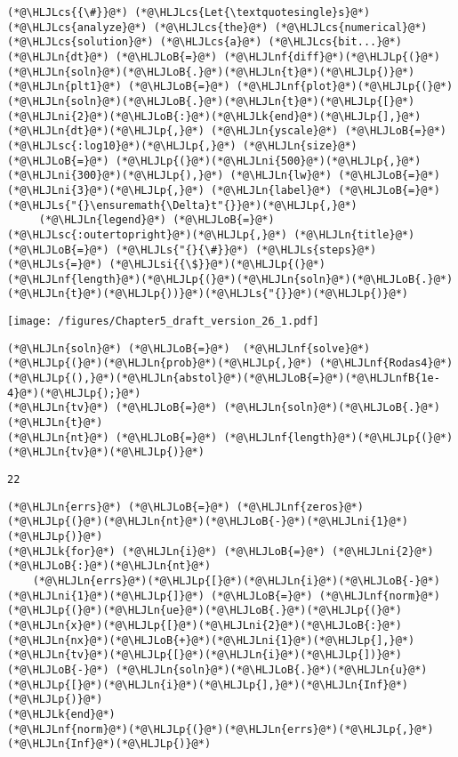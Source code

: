 \documentclass[12pt,a4paper]{article}
\newcommand{\HLJLk}[1]{\textcolor[RGB]{148,91,176}{\textbf{#1}}}
\newcommand{\HLJLn}[1]{#1}
\newcommand{\HLJLnf}[1]{\textcolor[RGB]{66,102,213}{#1}}
\newcommand{\HLJLs}[1]{\textcolor[RGB]{201,61,57}{#1}}
\newcommand{\HLJLsc}[1]{\textcolor[RGB]{201,61,57}{#1}}
\newcommand{\HLJLsi}[1]{#1}
\newcommand{\HLJLnfB}[1]{\textcolor[RGB]{59,151,46}{#1}}
\newcommand{\HLJLni}[1]{\textcolor[RGB]{59,151,46}{#1}}
\newcommand{\HLJLoB}[1]{\textcolor[RGB]{102,102,102}{\textbf{#1}}}
\newcommand{\HLJLp}[1]{#1}
\newcommand{\HLJLcs}[1]{\textcolor[RGB]{153,153,119}{\textit{#1}}}
\begin{document}
\begin{lstlisting}
(*@\HLJLcs{{\#}}@*) (*@\HLJLcs{Let{\textquotesingle}s}@*) (*@\HLJLcs{analyze}@*) (*@\HLJLcs{the}@*) (*@\HLJLcs{numerical}@*) (*@\HLJLcs{solution}@*) (*@\HLJLcs{a}@*) (*@\HLJLcs{bit...}@*)
(*@\HLJLn{dt}@*) (*@\HLJLoB{=}@*) (*@\HLJLnf{diff}@*)(*@\HLJLp{(}@*)(*@\HLJLn{soln}@*)(*@\HLJLoB{.}@*)(*@\HLJLn{t}@*)(*@\HLJLp{)}@*)
(*@\HLJLn{plt1}@*) (*@\HLJLoB{=}@*) (*@\HLJLnf{plot}@*)(*@\HLJLp{(}@*)(*@\HLJLn{soln}@*)(*@\HLJLoB{.}@*)(*@\HLJLn{t}@*)(*@\HLJLp{[}@*)(*@\HLJLni{2}@*)(*@\HLJLoB{:}@*)(*@\HLJLk{end}@*)(*@\HLJLp{],}@*) (*@\HLJLn{dt}@*)(*@\HLJLp{,}@*) (*@\HLJLn{yscale}@*) (*@\HLJLoB{=}@*) (*@\HLJLsc{:log10}@*)(*@\HLJLp{,}@*) (*@\HLJLn{size}@*) (*@\HLJLoB{=}@*) (*@\HLJLp{(}@*)(*@\HLJLni{500}@*)(*@\HLJLp{,}@*) (*@\HLJLni{300}@*)(*@\HLJLp{),}@*) (*@\HLJLn{lw}@*) (*@\HLJLoB{=}@*) (*@\HLJLni{3}@*)(*@\HLJLp{,}@*) (*@\HLJLn{label}@*) (*@\HLJLoB{=}@*) (*@\HLJLs{"{}\ensuremath{\Delta}t"{}}@*)(*@\HLJLp{,}@*) 
     (*@\HLJLn{legend}@*) (*@\HLJLoB{=}@*) (*@\HLJLsc{:outertopright}@*)(*@\HLJLp{,}@*) (*@\HLJLn{title}@*) (*@\HLJLoB{=}@*) (*@\HLJLs{"{}{\#}}@*) (*@\HLJLs{steps}@*) (*@\HLJLs{=}@*) (*@\HLJLsi{{\$}}@*)(*@\HLJLp{(}@*)(*@\HLJLnf{length}@*)(*@\HLJLp{(}@*)(*@\HLJLn{soln}@*)(*@\HLJLoB{.}@*)(*@\HLJLn{t}@*)(*@\HLJLp{))}@*)(*@\HLJLs{"{}}@*)(*@\HLJLp{)}@*)
\end{lstlisting}

\texttt{[image: /figures/Chapter5\_draft\_version\_26\_1.pdf]}

\begin{lstlisting}
(*@\HLJLn{soln}@*) (*@\HLJLoB{=}@*)  (*@\HLJLnf{solve}@*)(*@\HLJLp{(}@*)(*@\HLJLn{prob}@*)(*@\HLJLp{,}@*) (*@\HLJLnf{Rodas4}@*)(*@\HLJLp{(),}@*)(*@\HLJLn{abstol}@*)(*@\HLJLoB{=}@*)(*@\HLJLnfB{1e-4}@*)(*@\HLJLp{);}@*)
(*@\HLJLn{tv}@*) (*@\HLJLoB{=}@*) (*@\HLJLn{soln}@*)(*@\HLJLoB{.}@*)(*@\HLJLn{t}@*)
(*@\HLJLn{nt}@*) (*@\HLJLoB{=}@*) (*@\HLJLnf{length}@*)(*@\HLJLp{(}@*)(*@\HLJLn{tv}@*)(*@\HLJLp{)}@*)
\end{lstlisting}

\begin{lstlisting}
22
\end{lstlisting}


\begin{lstlisting}
(*@\HLJLn{errs}@*) (*@\HLJLoB{=}@*) (*@\HLJLnf{zeros}@*)(*@\HLJLp{(}@*)(*@\HLJLn{nt}@*)(*@\HLJLoB{-}@*)(*@\HLJLni{1}@*)(*@\HLJLp{)}@*)
(*@\HLJLk{for}@*) (*@\HLJLn{i}@*) (*@\HLJLoB{=}@*) (*@\HLJLni{2}@*)(*@\HLJLoB{:}@*)(*@\HLJLn{nt}@*)
    (*@\HLJLn{errs}@*)(*@\HLJLp{[}@*)(*@\HLJLn{i}@*)(*@\HLJLoB{-}@*)(*@\HLJLni{1}@*)(*@\HLJLp{]}@*) (*@\HLJLoB{=}@*) (*@\HLJLnf{norm}@*)(*@\HLJLp{(}@*)(*@\HLJLn{ue}@*)(*@\HLJLoB{.}@*)(*@\HLJLp{(}@*)(*@\HLJLn{x}@*)(*@\HLJLp{[}@*)(*@\HLJLni{2}@*)(*@\HLJLoB{:}@*)(*@\HLJLn{nx}@*)(*@\HLJLoB{+}@*)(*@\HLJLni{1}@*)(*@\HLJLp{],}@*)(*@\HLJLn{tv}@*)(*@\HLJLp{[}@*)(*@\HLJLn{i}@*)(*@\HLJLp{])}@*) (*@\HLJLoB{-}@*) (*@\HLJLn{soln}@*)(*@\HLJLoB{.}@*)(*@\HLJLn{u}@*)(*@\HLJLp{[}@*)(*@\HLJLn{i}@*)(*@\HLJLp{],}@*)(*@\HLJLn{Inf}@*)(*@\HLJLp{)}@*)
(*@\HLJLk{end}@*)
(*@\HLJLnf{norm}@*)(*@\HLJLp{(}@*)(*@\HLJLn{errs}@*)(*@\HLJLp{,}@*)(*@\HLJLn{Inf}@*)(*@\HLJLp{)}@*)
\end{lstlisting}
\end{document}
